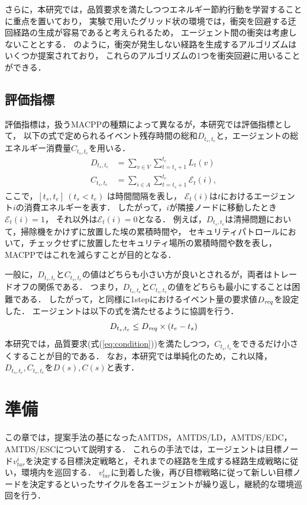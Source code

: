 \documentclass[12pt,a4j,twoside]{jarticle}
\def\AgentSet{A}
\def\Dreq{{D_{\it req}}}
\def\En{\mathcal{E}}
\begin{document}
さらに，本研究では，品質要求を満たしつつエネルギー節約行動を学習することに重点を置いており，
実験で用いたグリッド状の環境では，衝突を回避する迂回経路の生成が容易であると考えられるため，
エージェント間の衝突は考慮しないこととする．
\cite{Yamauchi2022,Satish2017}のように，衝突が発生しない経路を生成するアルゴリズムはいくつか提案されており，
これらのアルゴリズムの1つを衝突回避に用いることができる．

\subsection{評価指標}
評価指標は，扱うMACPPの種類によって異なるが，本研究では評価指標として，
以下の式で定められるイベント残存時間の総和$D_{t_s,t_e}$と，エージェントの総エネルギー消費量$C_{t_s,t_e}$を用いる．
%
\begin{align}
  D_{t_s,t_e} &= \sum_{v \in V} \sum^{t_e}_{t=t_s+1} L_t(v)\\
  C_{t_s,t_e} &= \sum_{i \in \AgentSet} \sum^{t_e}_{t=t_s+1} \En_t(i),
\end{align}
%
ここで，$[t_s,t_e]~(t_s < t_e)$ は時間間隔を表し，
$\En_t(i)$は$t$におけるエージェント$i$の消費エネルギーを表す．
したがって，$i$が隣接ノードに移動したとき$\En_t(i)=1$，
それ以外は$\En_t(i)=0$となる．
例えば，$D_{t_s,t_e}$は清掃問題において，掃除機をかけずに放置した埃の累積時間や，
セキュリティパトロールにおいて，チェックせずに放置したセキュリティ場所の累積時間や数を表し，
MACPPではこれを減らすことが目的となる．
\par
一般に，$D_{t_s,t_e}$と$C_{t_s,t_e}$の値はどちらも小さい方が良いとされるが，両者はトレードオフの関係である．
つまり，$D_{t_s,t_e}$と$C_{t_s,t_e}$の値をどちらも最小にすることは困難である．
したがって，\cite{Wu2019}と同様に1stepにおけるイベント量の要求値$\Dreq$を設定した．
エージェントは以下の式を満たせるように協調を行う．
%
\begin{equation}\label{eq:condition}
  D_{t_s,t_e}\leq \Dreq \times (t_e - t_s)
\end{equation}
%
本研究では，品質要求(式(\ref{eq:condition}))を満たしつつ，$C_{t_s, t_e}$をできるだけ小さくすることが目的である．
なお，本研究では単純化のため，これ以降，$D_{t_s,t_e}, C_{t_s,t_e}$を$D(s), C(s)$と表す．

\section{準備}
この章では，提案手法の基になったAMTDS，AMTDS/LD，AMTDS/EDC，AMTDS/ESCについて説明する．
これらの手法では，エージェントは目標ノード$v^i_{tar}$を決定する目標決定戦略と，それまでの経路を生成する経路生成戦略に従い，環境内を巡回する．
$v^i_{tar}$に到着した後，再び目標戦略に従って新しい目標ノードを決定するといったサイクルを各エージェントが繰り返し，継続的な環境巡回を行う．
\end{document}
